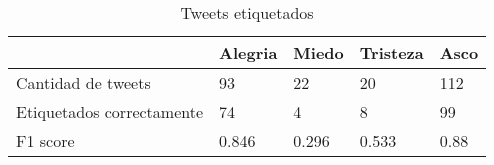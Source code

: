 \begin{table}
\caption{Tweets etiquetados}
\label{table:labeled_tweets}
\begin{tabular}{lllll}
\toprule
 & Alegria & Miedo & Tristeza & Asco \\
\midrule
Cantidad de tweets & 93 & 22 & 20 & 112 \\
Etiquetados correctamente & 74 & 4 & 8 & 99 \\
F1 score & 0.846 & 0.296 & 0.533 & 0.88 \\
\bottomrule
\end{tabular}
\end{table}
